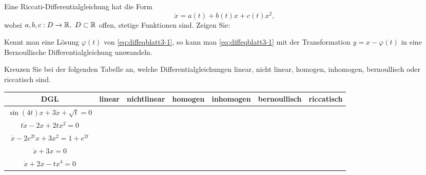 \begin{Problem}
	\begin{parts}
		\item Eine Riccati-Differentialgleichung hat die Form
			\begin{equation}\label{eq:diffeqblatt3-1}
	\dot{x}=a(t)+b(t)x+c(t)x^2
,\end{equation}
wobei $a,b,c:D\to \mathbb{R},~D\subset \mathbb{R}$ offen, stetige Funktionen sind. Zeigen Sie:

Kennt man eine L\"{o}sung $\varphi(t)$ von \eqref{eq:diffeqblatt3-1}, so kann man \eqref{eq:diffeqblatt3-1} mit der Transformation $y=x-\varphi(t)$ in eine Bernoullische Differentialgleichung umwandeln.
\item Kreuzen Sie bei der folgenden Tabelle an, welche Differentialgleichungen linear, nicht linear, homogen, inhomogen, bernoullisch oder riccatisch sind.

	\begin{tabular}{c|c|c|c|c|c|c}
		DGL & linear & nichtlinear & homogen & inhomogen & bernoullisch & riccatisch \\\hline
		$\sin(4t)x+3\dot{x}+\sqrt{t} =0$ & & & & & & \\\hline
		$t\dot{x}-2x+2tx^2=0$ & & & & & & \\\hline
		$\dot{x}-2e^{2t}x+3x^2=1+e^{2t}$ & & & & & & \\\hline
		$\dot{x}+3x=0$ & & & & & & \\\hline
		$\dot{x}+2x-tx^4=0$ & & & & & & 
	\end{tabular}
\end{parts}
\end{Problem}
